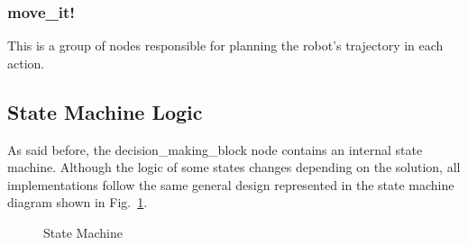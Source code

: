 \subsubsection{move\_it!}

This is a group of nodes responsible for planning the robot's trajectory in each action.

\subsection{State Machine Logic}

As said before, the decision\_making\_block node contains an internal state machine. Although the logic of some states changes depending on the solution, all implementations follow the same general design represented in the state machine diagram shown in Fig.~\ref{fig:state_machine}.

\begin{figure}[H]%
    \centering
    
    \caption{State Machine}
    \label{fig:state_machine}
\end{figure}

